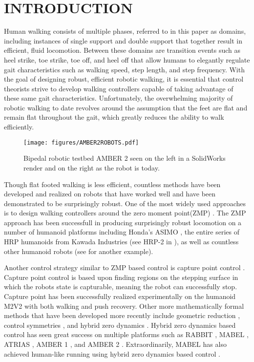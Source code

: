 \section{INTRODUCTION}
\raggedbottom

Human walking consists of multiple phases, referred to in this paper as domains, including instances of single support and double support that together result in efficient, fluid locomotion. Between these domains are transition events such as heel strike, toe strike, toe off, and heel off that allow humans to elegantly regulate gait characteristics such as walking speed, step length, and step frequency. With the goal of designing robust, efficient robotic walking, it is essential that control theorists strive to develop walking controllers capable of taking advantage of these same gait characteristics. Unfortunately, the overwhelming majority of robotic walking to date revolves around the assumption that the feet are flat and remain flat throughout the gait, which greatly reduces the ability to walk efficiently.
\begin{figure}[t!]
\centering
\texttt{[image: figures/AMBER2ROBOTS.pdf]}
\caption{Bipedal robotic testbed AMBER 2 seen on the left in a SolidWorks render and on the right 
as the robot is today.}
\label{fig:robots}
\end{figure}

Though flat footed walking is less efficient, countless methods have been developed and realized on robots that have worked well and have been demonstrated to be surprisingly robust. One of the most widely used approaches is to design walking controllers around the zero moment point(ZMP)  \cite{KKKFHYH06,VB05}. The ZMP approach has been successfull in producing surprisingly robust locomotion on a number of humanoid platforms including Honda's ASIMO \cite{LG10}, the entire series of HRP humanoids from Kawada Industries (see HRP-2 in \cite{TIOMA09}), as well as countless other humanoid robots (see \cite{KNKKII02} for another example).

Another control strategy similar to ZMP based control is capture point control \cite{KBRGP12,PCD06}. Capture point control is based
upon finding regions on the stepping surface in which the robots state is capturable, meaning the robot can successfully stop. Capture point has been successfully
realized experimentally on the humanoid M2V2 \cite{PKBRCCJN12} with both walking and push recovery.
Other more mathematically formal methods that have been developed more recently include geometric
reduction \cite{GCAS10,SA:CDC09-2}, control symmetries \cite{SB05}, and hybrid zero
dynamics \cite{Ames:NAO:2012,Ames11,GCAS10}. Hybrid zero dynamics based control has seen great success on multiple platforms such as RABBIT \cite{CAAPWCG03}, MABEL \cite{SPPG10}, ATRIAS \cite{url:AtriasWalk}, AMBER 1 \cite{YPA12}, and AMBER 2 \cite{url:AMBER2_Walk}. Extraordinarily, MABEL has also achieved
human-like running using hybrid zero dynamics based control \cite{SPPG10}. 


